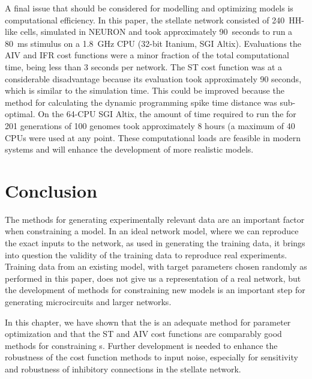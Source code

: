 A final issue that should be considered for modelling and optimizing {\BNN}
models is computational efficiency. In this paper, the {\CN} stellate network
consisted of 240~{HH}-like cells, simulated in {NEURON} and took approximately
90~seconds to run a 80~ms stimulus on a 1.8~GHz CPU (32-bit Itanium, SGI
Altix).  Evaluations the AIV and IFR cost functions were a minor fraction
of the total computational time, being less than 3 seconds per network. The
ST cost function was at a considerable disadvantage because its evaluation
took approximately 90 seconds, which is similar to the simulation
time. This could be improved because the method for calculating the dynamic
programming spike time distance was sub-optimal.  On the 64-CPU SGI Altix,
the amount of time required to run the {\GA} for 201 generations of 100
genomes took approximately 8 hours (a maximum of 40 CPUs were used at any
point.  These computational loads are feasible in modern systems and will
enhance the development of more realistic {\BNN} models.


\section{Conclusion}\label{sec:GA:conclusion}

The methods for generating experimentally relevant data are an important
factor when constraining a {\BNN} model. In an ideal network model, where we
can reproduce the exact inputs to the network, as used in generating the
training data, it brings into question the validity of the training data to
reproduce real experiments.  Training data from an existing model, with
target parameters chosen randomly as performed in this paper, does not give
us a representation of a real network, but the development of methods for
constraining new models is an important step for generating microcircuits
and larger networks.

\smallskip{}

In this chapter, we have shown that the {\GA} is an adequate method for
parameter optimization and that the ST and AIV cost functions are
comparably good methods for constraining {\BNN}s. Further development is
needed to enhance the robustness of the cost function methods to input
noise, especially for sensitivity and robustness of inhibitory connections
in the {\CN} stellate network.  


